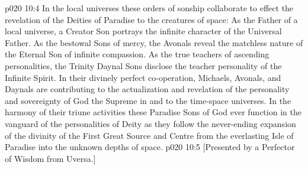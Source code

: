 \vs p020 10:4 In the local universes these orders of sonship collaborate to effect the revelation of the Deities of Paradise to the creatures of space: As the Father of a local universe, a Creator Son portrays the infinite character of the Universal Father. As the bestowal Sons of mercy, the Avonals reveal the matchless nature of the Eternal Son of infinite compassion. As the true teachers of ascending personalities, the Trinity Daynal Sons disclose the teacher personality of the Infinite Spirit. In their divinely perfect co\hyp{}operation, Michaels, Avonals, and Daynals are contributing to the actualization and revelation of the personality and sovereignty of God the Supreme in and to the time\hyp{}space universes. In the harmony of their triune activities these Paradise Sons of God ever function in the vanguard of the personalities of Deity as they follow the never\hyp{}ending expansion of the divinity of the First Great Source and Centre from the everlasting Isle of Paradise into the unknown depths of space.
\vsetoff
\vs p020 10:5 [Presented by a Perfector of Wisdom from Uversa.]
\quizlink
